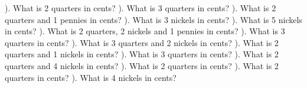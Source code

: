 \documentclass{article}%
\begin{document}
\newline%
). What is 2 quarters in cents?%
\newline%
\newline%
). What is 3 quarters in cents?%
\newline%
\newline%
). What is 2 quarters and 1 pennies in cents?%
\newline%
\newline%
). What is 3 nickels in cents?%
\newline%
\newline%
). What is 5 nickels in cents?%
\newline%
\newline%
). What is 2 quarters, 2 nickels and 1 pennies in cents?%
\newline%
\newline%
). What is 3 quarters in cents?%
\newline%
\newline%
). What is 3 quarters and 2 nickels in cents?%
\newline%
\newline%
). What is 2 quarters and 1 nickels in cents?%
\newline%
\newline%
). What is 3 quarters in cents?%
\newline%
\newline%
). What is 2 quarters and 4 nickels in cents?%
\newline%
\newline%
). What is 2 quarters in cents?%
\newline%
\newline%
). What is 2 quarters in cents?%
\newline%
\newline%
). What is 4 nickels in cents?%
\end{document}
